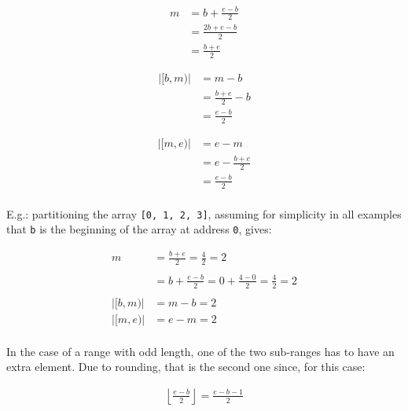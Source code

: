 \begin{multicols}{3}
    \begin{align*}
        m &= b + \frac{e - b}{2} \\
          &= \frac{2b + e - b}{2} \\
          &= \frac{b + e}{2} \\
    \end{align*}
    \columnbreak
    \begin{align*} \\
        |[b, m)| &= m - b \phantom{\frac{1}{1}} \\
                 &= \frac{b + e}{2} - b \\
                 &= \frac{e - b}{2} \\
    \end{align*}
    \columnbreak
    \begin{align*} \\
        |[m, e)| &= e - m \phantom{\frac{1}{1}} \\
                 &= e - \frac{b + e}{2} \\
                 &= \frac{e - b}{2} \\
    \end{align*}
\end{multicols}

E.g.: partitioning the array \texttt{[0, 1, 2, 3]}, assuming for simplicity in
all examples that \texttt{b} is the beginning of the array at address
\texttt{0}, gives:

\begin{align*}
           m &= \frac{b + e}{2}
              = \frac{4}{2}
              = 2 \\\\
             &= b + \frac{e - b}{2}
              = 0 + \frac{4 - 0}{2}
              = \frac{4}{2}
              = 2 \\\\
    |[b, m)| &= m - b = 2 \\
    |[m, e)| &= e - m = 2 \\
\end{align*}

In the case of a range with odd length, one of the two sub-ranges has to have an
extra element.  Due to rounding, that is the second one since, for this case:

\begin{align*}
    \left\lfloor \frac{e - b}{2} \right\rfloor = \frac{e - b - 1}{2} \\
\end{align*}

